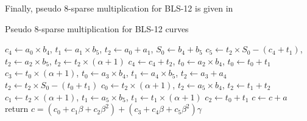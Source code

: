 Finally, pseudo 8-sparse multiplication for  BLS-12 is given in 
\begin{algorithm}[htbp]
	\caption{Pseudo 8-sparse multiplication for BLS-12 curves}
	\label{sparse_mul}
	\DontPrintSemicolon

	\hspace{-3ex}
	\hspace{-3ex}
	\nl $c_4\leftarrow a_0\times b_4$, $t_1\leftarrow a_1\times b_5$, $t_2\leftarrow a_0+a_1$, $S_0\leftarrow b_4+b_5$\;
	\nl $c_5\leftarrow t_2\times S_0-(c_4+t_1)$, $t_2\leftarrow a_2 \times b_5$, $t_2 \leftarrow t_2 \times (\alpha+1)$\;
	\nl $c_4\leftarrow c_4+t_2$, $t_0 \leftarrow a_2 \times b_4$, $t_0 \leftarrow t_0+t_1$\;
	\nl $c_3 \leftarrow t_0 \times (\alpha+1)$, $t_0\leftarrow a_3 \times b_4$, $t_1\leftarrow a_4\times b_5$, $t_2\leftarrow a_3+a_4$\;
	\nl $t_2 \leftarrow t_2 \times S_0-(t_0+t_1)$\;
	\nl $c_0 \leftarrow t_2 \times (\alpha+1)$, $t_2 \leftarrow a_5 \times b_4$, $t_2 \leftarrow t_1+t_2$\;
	\nl $c_1 \leftarrow t_2 \times (\alpha+1)$, $t_1 \leftarrow a_5 \times b_5$, $t_1 \leftarrow t_1 \times (\alpha+1)$\;
	\nl $c_2 \leftarrow t_0+t_1$\;
	\nl $c\leftarrow c+a$\;
	\nl return $c=(c_0+c_1\beta+c_2\beta^2)+(c_3+c_4\beta+c_5\beta^2)\gamma$
\end{algorithm}

\vspace{-0.6em}

